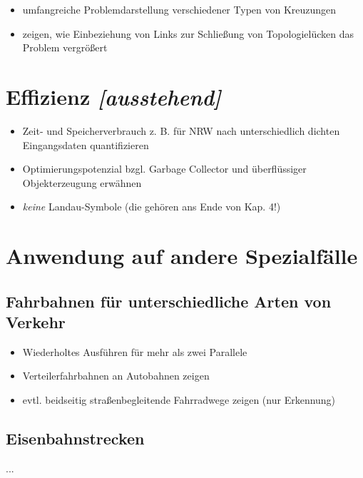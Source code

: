 \documentclass[../main/thesis.tex]{subfiles}
\begin{document}

\begin{itemize}
\item umfangreiche Problemdarstellung verschiedener Typen von Kreuzungen
\item zeigen, wie Einbeziehung von Links zur Schließung von Topologielücken das Problem vergrößert
\end{itemize}



\section{Effizienz \emph{[ausstehend]}}

\begin{itemize}
\item Zeit- und Speicherverbrauch z. B. für NRW nach unterschiedlich dichten Eingangsdaten quantifizieren
\item Optimierungspotenzial bzgl. Garbage Collector und überflüssiger Objekterzeugung erwähnen
\item \emph{keine} Landau-Symbole (die gehören ans Ende von Kap. 4!)
\end{itemize}



\section{Anwendung auf andere Spezialfälle}

\subsection{Fahrbahnen für unterschiedliche Arten von Verkehr}
\label{ch:iterated-execution}

\begin{itemize}
\item Wiederholtes Ausführen für mehr als zwei Parallele
\item Verteilerfahrbahnen an Autobahnen zeigen
\item evtl. beidseitig straßenbegleitende Fahrradwege zeigen (nur Erkennung)
\end{itemize}



\subsection{Eisenbahnstrecken}

...






\end{document}
